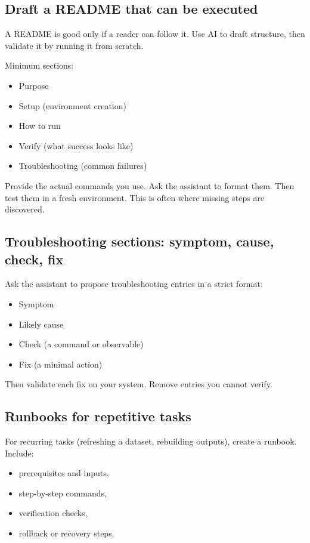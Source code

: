 \subsection{Draft a README that can be executed}
A README is good only if a reader can follow it. Use AI to draft structure, then validate it by running it from scratch.

Minimum sections:
\begin{itemize}[noitemsep]
  \item Purpose
  \item Setup (environment creation)
  \item How to run
  \item Verify (what success looks like)
  \item Troubleshooting (common failures)
\end{itemize}

Provide the actual commands you use. Ask the assistant to format them. Then test them in a fresh environment. This is often where missing steps are discovered.

\subsection{Troubleshooting sections: symptom, cause, check, fix}
Ask the assistant to propose troubleshooting entries in a strict format:
\begin{itemize}[noitemsep]
  \item Symptom
  \item Likely cause
  \item Check (a command or observable)
  \item Fix (a minimal action)
\end{itemize}

Then validate each fix on your system. Remove entries you cannot verify.

\subsection{Runbooks for repetitive tasks}
For recurring tasks (refreshing a dataset, rebuilding outputs), create a runbook. Include:
\begin{itemize}[noitemsep]
  \item prerequisites and inputs,
  \item step-by-step commands,
  \item verification checks,
  \item rollback or recovery steps.
\end{itemize}

